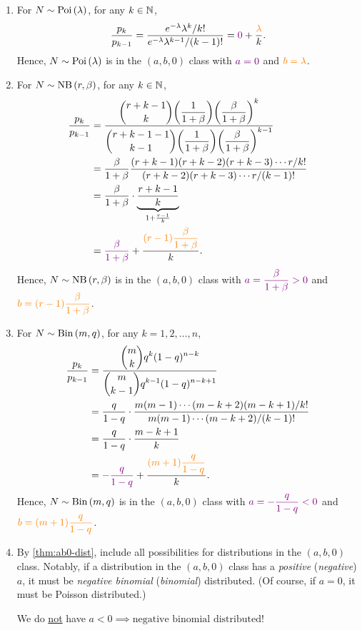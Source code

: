 \begin{enumerate}
\item \label{it:pois-ab0}
For \(N\sim\operatorname{Poi}\left(\lambda\right)\), for any \(k\in\mathbb{N}\),
\[
\frac{p_k}{p_{k-1}}=\frac{e^{-\lambda}\lambda^k/k!}{e^{-\lambda}\lambda^{k-1}/(k-1)!}
={\color{violet}0}+\frac{\color{orange}\lambda}{k}.
\]
Hence, \(N\sim\operatorname{Poi}\left(\lambda\right)\) is in the \((a,b,0)\) class with \(\color{violet}a=0\) and
\(\color{orange}b=\lambda\).

\item \label{it:nb-ab0}
For \(N\sim\operatorname{NB}\left(r,\beta\right)\), for any \(k\in\mathbb{N}\),
\begin{align*}
\frac{p_k}{p_{k-1}}
&=\frac{\displaystyle \binom{r+k-1}{k}\qty(\frac{1}{1+\beta})\qty(\frac{\beta}{1+\beta})^{k}}
{\displaystyle \binom{r+k-1-1}{k-1}\qty(\frac{1}{1+\beta})\qty(\frac{\beta}{1+\beta})^{k-1}}\\
&=\frac{\beta}{1+\beta}\frac{(r+k-1)(r+k-2)(r+k-3)\dotsb r/k!}{(r+k-2)(r+k-3)\dotsb r/(k-1)!}\\
&=\frac{\beta}{1+\beta}\cdot\underbrace{\frac{r+k-1}{k}}_{1+\frac{r-1}{k}}\\
&={\color{violet}\frac{\beta}{1+\beta}}+\frac{\displaystyle {\color{orange}(r-1)\frac{\beta}{1+\beta}}}{k}.
\end{align*}
Hence, \(N\sim\operatorname{NB}\left(r,\beta\right)\) is in the \((a,b,0)\) class with
\(\displaystyle \color{violet}a=\frac{\beta}{1+\beta}>0\) and
\(\displaystyle \color{orange}b=(r-1)\frac{\beta}{1+\beta}\).

\item \label{it:bin-ab0}
For \(N\sim\operatorname{Bin}\left(m,q\right)\), for any \(k=1,2,\dotsc,n\),
\begin{align*}
\frac{p_k}{p_{k-1}}&=\frac{\displaystyle \binom{m}{k}q^k(1-q)^{n-k}}{\displaystyle \binom{m}{k-1}q^{k-1}(1-q)^{n-k+1}}\\
&=\frac{q}{1-q}\cdot\frac{m(m-1)\dotsb(m-k+2)(m-k+1)/k!}{m(m-1)\dotsb(m-k+2)/(k-1)!}\\
&=\frac{q}{1-q}\cdot\frac{m-k+1}{k}\\
&={\color{violet}-\frac{q}{1-q}}+\frac{\displaystyle \color{orange}(m+1)\frac{q}{1-q}}{k}.
\end{align*}
Hence, \(N\sim\operatorname{Bin}\left(m,q\right)\) is in the \((a,b,0)\) class with
\(\displaystyle \color{violet}a=-\frac{q}{1-q}<0\) and
\(\displaystyle \color{orange}b=(m+1)\frac{q}{1-q}\).
\item By \cref{thm:ab0-dist}, 
include all possibilities for distributions in the \((a,b,0)\) class. Notably,
if a distribution in the \((a,b,0)\) class has a \emph{positive}
(\emph{negative}) \(a\), it must be \emph{negative binomial} (\emph{binomial})
distributed. (Of course, if \(a=0\), it must be Poisson distributed.)
\begin{warning}
We do \underline{not} have \(a<0\implies\text{negative binomial distributed}\)!
\end{warning}


\end{enumerate}
